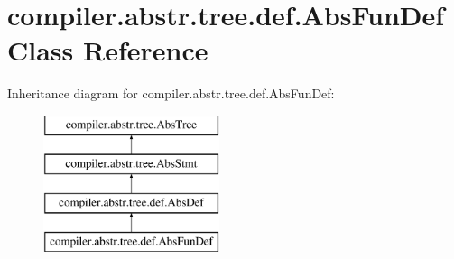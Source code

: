 \hypertarget{classcompiler_1_1abstr_1_1tree_1_1def_1_1_abs_fun_def}{}\section{compiler.\+abstr.\+tree.\+def.\+Abs\+Fun\+Def Class Reference}
\label{classcompiler_1_1abstr_1_1tree_1_1def_1_1_abs_fun_def}
Inheritance diagram for compiler.\+abstr.\+tree.\+def.\+Abs\+Fun\+Def\+:\begin{figure}[H]
\begin{center}
\leavevmode
\includegraphics[height=4.000000cm]{classcompiler_1_1abstr_1_1tree_1_1def_1_1_abs_fun_def}
\end{center}
\end{figure}
